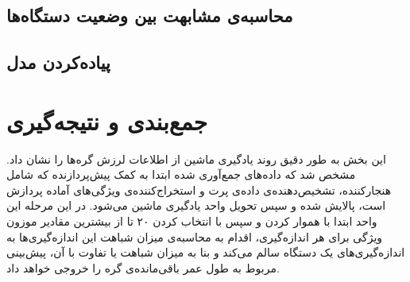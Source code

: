 \subsection{محاسبه‌ی مشابهت بین وضعیت دستگاه‌ها}

\subsection{پیاده‌کردن مدل}


\section{جمع‌بندی و نتیجه‌گیری}
این بخش به طور دقیق روند یادگیری ماشین از اطلاعات لرزش گره‌ها را نشان داد. مشخص شد که داده‌های جمع‌آوری شده ابتدا به کمک پیش‌پردازنده که شامل هنجارکننده، تشخیص‌دهنده‌ی داده‌ی پرت و استخراج‌کننده‌ی ویژگی‌های آماده پردازش است، پالایش شده و سپس تحویل واحد یادگیری ماشین می‌شود. در این مرحله این واحد ابتدا با هموار کردن و سپس با انتخاب کردن ۲۰ تا از بیشترین مقادیر موزون ویژگی  برای هر اندازه‌گیری، اقدام به محاسبه‌ی میزان شباهت این اندازه‌گیری‌ها به اندازه‌گیری‌های یک دستگاه سالم می‌کند و بنا به میزان شباهت یا تفاوت با آن، پیش‌بینی مربوط به طول عمر باقی‌مانده‌ی گره را خروجی خواهد داد.
